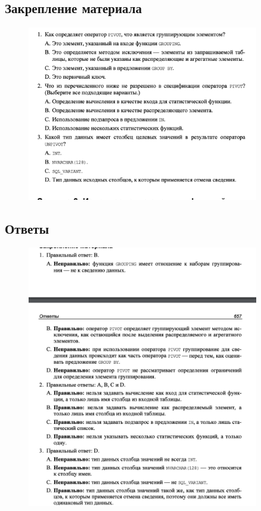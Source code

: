 \subsection*{Закрепление материала}

\begin{figure}[h!]
	\begin{center}
		\includegraphics[width=0.9\textwidth]{img/zakrep12.png}
	\end{center}
	\captionsetup{justification=centering}
\end{figure}
\clearpage

\subsection*{Ответы}

\begin{figure}[h!]
	\begin{center}
		\includegraphics[width=0.9\textwidth]{img/ans12.png}
	\end{center}
	\captionsetup{justification=centering}
\end{figure}


